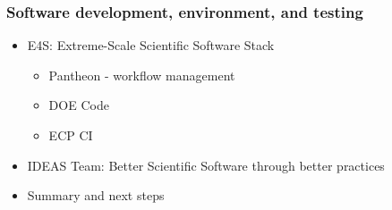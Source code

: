 \def\CC{{C\nolinebreak[4]\hspace{-.05em}\raisebox{.4ex}{\tiny\bf ++}}}


\begin{frame}\frametitle{Software development, environment, and testing}
\begin{itemize}
\item E4S: Extreme-Scale Scientific Software Stack %
\begin{itemize}
\item Pantheon - workflow management
\item DOE Code
\item ECP CI
\end{itemize}
\item IDEAS Team: Better Scientific Software through better practices
\item Summary and next steps
\end{itemize}
\end{frame}

